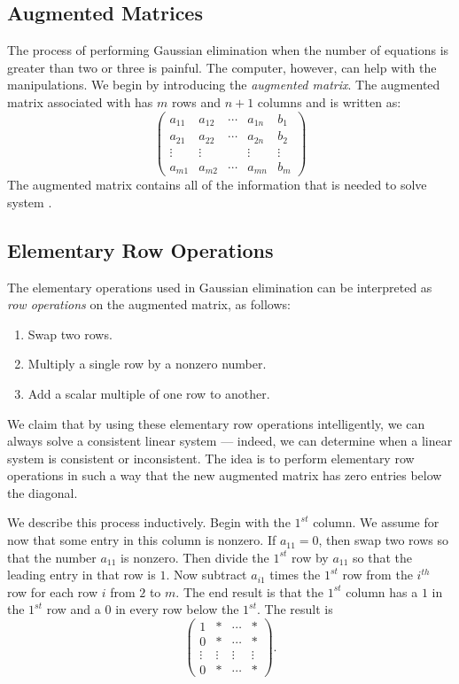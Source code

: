 \documentclass{ximera}
\begin{document}
\subsection*{Augmented Matrices}

The process of performing Gaussian elimination when the number
of equations is greater than two or three is painful.  The
computer, however, can help with the manipulations.  We begin by
introducing the {\em augmented matrix\/}. 
The augmented matrix associated with  has
$m$ rows and $n+1$ columns and is written as:
\begin{equation}  \label{augmented}
\left(
\begin{array}{rrrr|r}
 a_{11} & a_{12} & \cdots & a_{1n} &  b_1 \\
 a_{21} & a_{22} & \cdots & a_{2n} &  b_2 \\
 \vdots & \vdots &        & \vdots & \vdots \\
 a_{m1} & a_{m2} & \cdots & a_{mn} &  b_m
\end{array}
\right)
\end{equation}
The augmented matrix contains all of the information that is
needed to solve system .

\subsection*{Elementary Row Operations} 

The elementary operations used in Gaussian elimination
can be interpreted as {\em row operations\/} on
the augmented matrix, as follows:
\begin{enumerate}
\item   Swap two rows.
\item   Multiply a single row by a nonzero number.
\item   Add a scalar multiple of one row to another.
\end{enumerate}
We claim that by using these elementary row operations
intelligently, we can always solve a consistent linear system
--- indeed, we can determine when a linear system is consistent
or inconsistent.  The idea is to perform elementary row
operations in such a way that the new augmented matrix has zero
entries below the diagonal.

We describe this process inductively.  Begin with the $1^{st}$
column.  We assume for now that some entry in this column is
nonzero.  If $a_{11}=0$, then swap two rows so that the
number $a_{11}$ is nonzero.  Then divide the $1^{st}$ row by
$a_{11}$ so that the leading entry in that row is $1$.  Now
subtract $a_{i1}$ times the $1^{st}$ row from the $i^{th}$ row
for each row $i$ from $2$ to $m$.  The end result is that the
$1^{st}$ column has a $1$ in the $1^{st}$ row and a $0$ in every
row below the $1^{st}$.  The result is
\[
\left(\begin{array}{cccc}  1 & * & \cdots & * \\
0 & * & \cdots & * \\ \vdots & \vdots & \vdots & \vdots \\
0 & * & \cdots & * \end{array} \right).
\]
\end{document}
